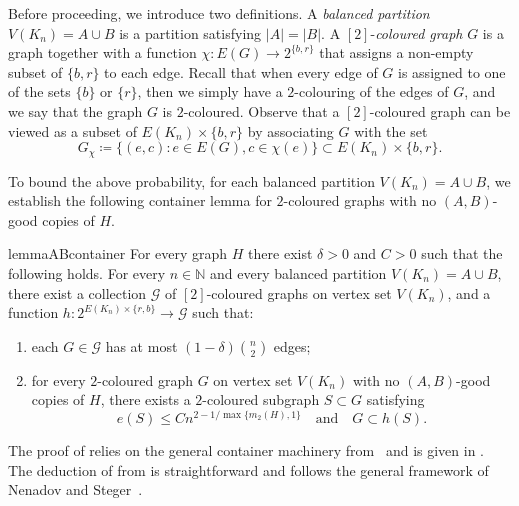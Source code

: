 \documentclass[a4paper,reqno,11pt]{amsart}
\theoremstyle{definition}
\theoremstyle{remark}
\newcommand\cG{\mathcal{G}}
\renewcommand\le{\leqslant}
\renewcommand\to{\rightarrow}
\begin{document}
Before proceeding, we introduce two definitions. A \emph{balanced partition} $V(K_n)=A\cup B$ is a partition satisfying $|A|=|B|$. A $[2]$-\emph{coloured graph} $G$ is a graph together with a function $\chi\colon E(G) \to 2^{\{b,r\}}$ that assigns a non-empty subset of $\{b,r\}$ to each edge. Recall that when every edge of $G$ is assigned to one of the sets $\{b\}$ or $\{r\}$, then we simply have a $2$-colouring of the edges of $G$, and we say that the graph $G$ is $2$-coloured. Observe that a \mbox{$[2]$-coloured} graph can be viewed as a subset of $E(K_n) \times \{b,r\}$ by associating $G$ with the set
\[G_{\chi}\coloneqq\big\{(e,c) \colon e \in E(G), c \in \chi(e)\big\} \subset E(K_n)\times\{b,r\}.\]

To bound the above probability, for each balanced partition $V(K_n)=A\cup B$, we establish the following container lemma for $2$-coloured graphs with no $(A,B)$-good copies of $H$. 

\begin{restatable}{lemma}{ABcontainer}
\label{lem:ABcontainer}
For every graph $H$ there exist $\delta>0$ and $C>0$ such that the following holds. For every $n \in \mathbb{N}$ and every balanced partition $V(K_n) = A \cup B$, there exist a collection $\cG$ of $[2]$-coloured graphs on vertex set $V(K_n)$, and a function $h\colon 2^{E(K_n) \times \{r,b\}} \to \cG$ such that:
\begin{enumerate}[label=\textnormal{(\roman*)}]
\item\label{item:ABcontainer1} each $G \in \cG$ has at most $(1-\delta)\binom{n}{2}$ edges;
\item\label{item:ABcontainer2} for every $2$-coloured graph $G$ on vertex set $V(K_n)$ with no $(A,B)$-good copies of $H$, there exists a $2$-coloured subgraph $S \subset G$ satisfying
\[e(S) \le Cn^{2-1/\max\{m_2(H),1\}}\quad\text{and}\quad G \subset h(S).\]
\end{enumerate}
\end{restatable}

The proof of  relies on the general container machinery from~\cite{BMS,ST} and is given in . The deduction of  from  is straightforward and follows the general framework of Nenadov and Steger~\cite{NS}.
\end{document}
